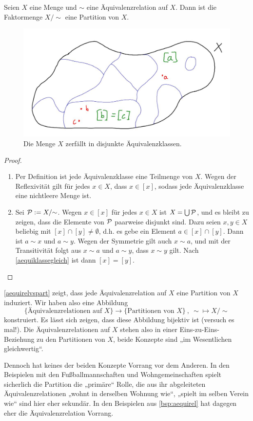 \begin{satz} \label{aequirelvspart}
    Seien $X$ eine Menge und $\sim$ eine Äquivalenzrelation auf $X$. Dann ist die Faktormenge $X/{\sim}$ eine Partition von $X$.
    \begin{figure}[ht]
        \includegraphics[width=12cm]{./_img/equivalence.jpeg}
        \centering \caption{Die Menge $X$ zerfällt in disjunkte Äquivalenzklassen.}
    \end{figure}
\end{satz}
\begin{proof}
\begin{enumerate}[(P1)]
    \item Per Definition ist jede Äquivalenzklasse eine Teilmenge von $X$. Wegen der Reflexivität gilt für jedes $x\in X$, dass $x\in[x]$, sodass jede Äquivalenzklasse eine nichtleere Menge ist.
    \item Sei $\mathcal P:=X/{\sim}$. Wegen $x\in [x]$ für jedes $x\in X$ ist $X=\bigcup \mathcal P$, und es bleibt zu zeigen, dass die Elemente von $\mathcal P$ paarweise disjunkt sind. Dazu seien $x,y\in X$ beliebig mit $[x]\cap [y]\neq \emptyset$, d.h. es gebe ein Element $a\in [x]\cap [y]$. Dann ist $a\sim x$ und $a\sim y$. Wegen der Symmetrie gilt auch $x\sim a$, und mit der Transitivität folgt aus $x\sim a$ und $a\sim y$, dass $x\sim y$ gilt. Nach \cref{aequiklassegleich} ist dann $[x]=[y]$. \qedhere
\end{enumerate}
\end{proof}


\begin{bem}
    \cref{aequirelvspart} zeigt, dass jede Äquivalenzrelation auf $X$ eine Partition von $X$ induziert. Wir haben also eine Abbildung
        \[ \{ \text{Äquivalenzrelationen auf $X$}\} \to \{ \text{Partitionen von $X$}\} \ ,\ {\sim} \mapsto X/{\sim} \]
    konstruiert. Es lässt sich zeigen, dass diese Abbildung bijektiv ist (versuch es mal!). Die Äquivalenzrelationen auf $X$ stehen also in einer Eins-zu-Eins-Beziehung zu den Partitionen von $X$, beide Konzepte sind „im Wesentlichen gleichwertig“.
    
    Dennoch hat keines der beiden Konzepte Vorrang vor dem Anderen. In den Beispielen mit den Fußballmannschaften und Wohngemeinschaften spielt sicherlich die Partition die „primäre“ Rolle, die aus ihr abgeleiteten Äquivalenzrelationen „wohnt in derselben Wohnung wie“, „spielt im selben Verein wie“ sind hier eher sekundär. In den Beispielen aus \cref{bsp:aequirel} hat dagegen eher die Äquivalenzrelation Vorrang.
\end{bem}





